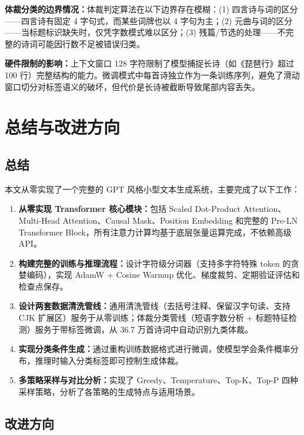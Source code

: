 \documentclass[a4paper, 12pt, centering, AutoFakeBold]{article}
\begin{document}
\textbf{体裁分类的边界情况：}体裁判定算法在以下边界存在模糊：(1) 四言诗与词的区分——四言诗有固定 4 字句式，而某些词牌也以 4 字句为主；(2) 元曲与词的区分——当标题标识缺失时，仅凭字数模式难以区分；(3) 残篇/节选的处理——不完整的诗词可能因行数不足被错误归类。

\textbf{硬件限制的影响：}上下文窗口 128 字符限制了模型捕捉长诗（如《琵琶行》超过 100 行）完整结构的能力。微调模式中每首诗独立作为一条训练序列，避免了滑动窗口切分对标签语义的破坏，但代价是长诗被截断导致尾部内容丢失。

\section{总结与改进方向}

\subsection{总结}

本文从零实现了一个完整的 GPT 风格小型文本生成系统，主要完成了以下工作：

\begin{enumerate}
    \item \textbf{从零实现 Transformer 核心模块：}包括 Scaled Dot-Product Attention、Multi-Head Attention、Causal Mask、Position Embedding 和完整的 Pre-LN Transformer Block，所有注意力计算均基于底层张量运算完成，不依赖高级 API。
    \item \textbf{构建完整的训练与推理流程：}设计字符级分词器（支持多字符特殊 token 的贪婪编码），实现 AdamW + Cosine Warmup 优化、梯度裁剪、定期验证评估和检查点保存。
    \item \textbf{设计两套数据清洗管线：}通用清洗管线（去括号注释、保留汉字句读、支持 CJK 扩展区）服务于从零训练；体裁分类管线（短语字数分析 + 标题特征检测）服务于带标签微调，从 36.7 万首诗词中自动识别九类体裁。
    \item \textbf{实现分类条件生成：}通过重构训练数据格式进行微调，使模型学会条件概率分布，推理时输入分类标签即可控制生成体裁。
    \item \textbf{多策略采样与对比分析：}实现了 Greedy、Temperature、Top-K、Top-P 四种采样策略，分析了各策略的生成特点与适用场景。
\end{enumerate}

\subsection{改进方向}
\end{document}

